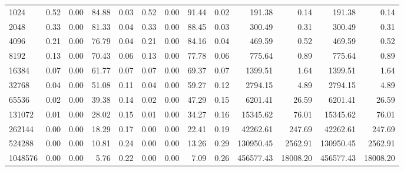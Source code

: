 \begin{tabular}{lrrrrrrrrrrrr}
1024     &        0.52 &        0.00 &         84.88 &          0.03 &           0.52 &           0.00 &        91.44 &         0.02 &           191.38 &             0.14 &          191.38 &            0.14 \\
2048     &        0.33 &        0.00 &         81.33 &          0.04 &           0.33 &           0.00 &        88.45 &         0.03 &           300.49 &             0.31 &          300.49 &            0.31 \\
4096     &        0.21 &        0.00 &         76.79 &          0.04 &           0.21 &           0.00 &        84.16 &         0.04 &           469.59 &             0.52 &          469.59 &            0.52 \\
8192     &        0.13 &        0.00 &         70.43 &          0.06 &           0.13 &           0.00 &        77.78 &         0.06 &           775.64 &             0.89 &          775.64 &            0.89 \\
16384    &        0.07 &        0.00 &         61.77 &          0.07 &           0.07 &           0.00 &        69.37 &         0.07 &          1399.51 &             1.64 &         1399.51 &            1.64 \\
32768    &        0.04 &        0.00 &         51.08 &          0.11 &           0.04 &           0.00 &        59.27 &         0.12 &          2794.15 &             4.89 &         2794.15 &            4.89 \\
65536    &        0.02 &        0.00 &         39.38 &          0.14 &           0.02 &           0.00 &        47.29 &         0.15 &          6201.41 &            26.59 &         6201.41 &           26.59 \\
131072   &        0.01 &        0.00 &         28.02 &          0.15 &           0.01 &           0.00 &        34.27 &         0.16 &         15345.62 &            76.01 &        15345.62 &           76.01 \\
262144   &        0.00 &        0.00 &         18.29 &          0.17 &           0.00 &           0.00 &        22.41 &         0.19 &         42262.61 &           247.69 &        42262.61 &          247.69 \\
524288   &        0.00 &        0.00 &         10.81 &          0.24 &           0.00 &           0.00 &        13.26 &         0.29 &        130950.45 &          2562.91 &       130950.45 &         2562.91 \\
1048576  &        0.00 &        0.00 &          5.76 &          0.22 &           0.00 &           0.00 &         7.09 &         0.26 &        456577.43 &         18008.20 &       456577.43 &        18008.20 \\

\end{tabular}
